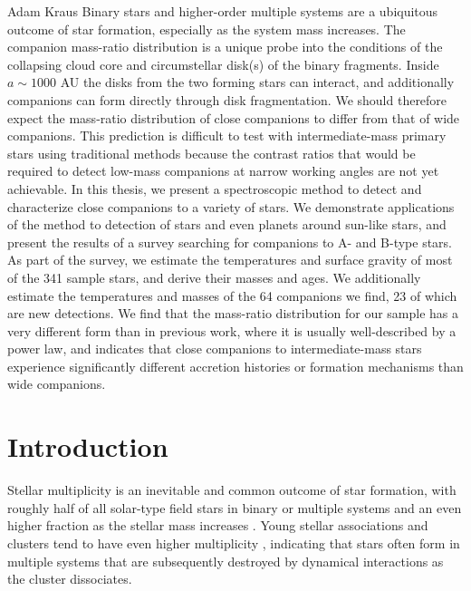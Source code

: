 \documentclass{utthesis}
\begin{document}
%
%

\begin{UTabstract}{Adam Kraus}
Binary stars and higher-order multiple systems are a ubiquitous outcome of star formation, especially as the system mass increases. The companion mass-ratio distribution is a unique probe into the conditions of the collapsing cloud core and circumstellar disk(s) of the binary fragments. Inside $a \sim 1000$ AU the disks from the two forming stars can interact, and additionally companions can form directly through disk fragmentation. We should therefore expect the mass-ratio distribution of close companions to differ from that of wide companions. This prediction is difficult to test with intermediate-mass primary stars using traditional methods because the contrast ratios that would be required to detect low-mass companions at narrow working angles are not yet achievable. In this thesis, we present a spectroscopic method to detect and characterize close companions to a variety of stars. We demonstrate applications of the method to detection of stars and even planets around sun-like stars, and present the results of a survey searching for companions to A- and B-type stars. As part of the survey, we estimate the temperatures and surface gravity of most of the 341 sample stars, and derive their masses and ages. We additionally estimate the temperatures and masses of the 64 companions we find, 23 of which are new detections. We find that the mass-ratio distribution for our sample has a very different form than in previous work, where it is usually well-described by a power law, and indicates that close companions to intermediate-mass stars experience significantly different accretion histories or formation mechanisms than wide companions.
\end{UTabstract}


\tableofcontents

\listoffigures

\listoftables

\mainmatter

\chapter{Introduction}

Stellar multiplicity is an inevitable and common outcome of star formation, with roughly half of all solar-type field stars in binary or multiple systems \citep{Raghavan2010} and an even higher fraction as the stellar mass increases \citep{Zinnecker2007}. Young stellar associations and clusters tend to have even higher multiplicity \citep{Duchene2013}, indicating that stars often form in multiple systems that are subsequently destroyed by dynamical interactions as the cluster dissociates. 
\end{document}
